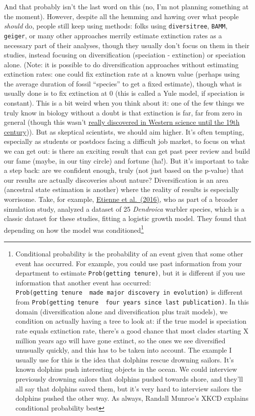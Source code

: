 \documentclass[]{article}
\let\rmarkdownfootnote\footnote%
\def\footnote{\protect\rmarkdownfootnote}
\begin{document}
And that probably isn't the last word on this (no, I'm not planning something at the moment). However, despite all the hemming and hawing over what people \emph{should} do, people still keep using methods: folks using \texttt{diversitree}, \texttt{BAMM}, \texttt{geiger}, or many other approaches merrily estimate extinction rates as a necessary part of their analyses, though they usually don't focus on them in their studies, instead focusing on diversification (speciation - extinction) or speciation alone. (Note: it is possible to do diversification approaches without estimating extinction rates: one could fix extinction rate at a known value (perhaps using the average duration of fossil ``species'' to get a fixed estimate), though what is usually done is to fix extinction at 0 (this is called a Yule model, if speciation is constant). This is a bit weird when you think about it: one of the few things we truly know in biology without a doubt is that extinction is far, far from zero in general (though this wasn't \href{http://www.ucmp.berkeley.edu/mammal/artio/irishelk.html}{really discovered in Western science until the 19th century})). But as skeptical scientists, we should aim higher. It's often tempting, especially as students or postdocs facing a difficult job market, to focus on what we can get out: is there an exciting result that can get past peer review and build our fame (maybe, in our tiny circle) and fortune (ha!). But it's important to take a step back: are we confident enough, truly (not just based on the p-value) that our results are actually discoveries about nature? Diversification is an area (ancestral state estimation is another) where the reality of results is especially worrisome. Take, for example, \href{http://onlinelibrary.wiley.com/doi/10.1111/2041-210X.12565/abstract}{Etienne et al.~(2016)}, who as part of a broader simulation study, analyzed a dataset of 25 \emph{Dendroica} warbler species, which is a classic dataset for these studies, fitting a logistic growth model. They found that depending on how the model was conditioned\footnote{Conditional probability is the probability of an event given that some other event has occurred. For example, you could use past information from your department to estimate \texttt{Prob(getting\ tenure)}, but it is different if you use information that another event has occurred: \texttt{Prob(getting\ tenure\ \textbar{}\ made\ major\ discovery\ in\ evolution)} is different from \texttt{Prob(getting\ tenure\ \textbar{}\ four\ years\ since\ last\ publication)}. In this domain (diversification alone and diversification plus trait models), we condition on actually having a tree to look at: if the true model is speciation rate equals extinction rate, there's a good chance that most clades starting X million years ago will have gone extinct, so the ones we see diversified unusually quickly, and this has to be taken into account. The example I usually use for this is the idea that dolphins rescue drowning sailors. It's known dolphins push interesting objects in the ocean. We could interview previously drowning sailors that dolphins pushed towards shore, and they'll all say that dolphins saved them, but it's very hard to interview sailors the dolphins pushed the other way. As always, Randall Munroe's XKCD explains conditional probability best
}
\end{document}
